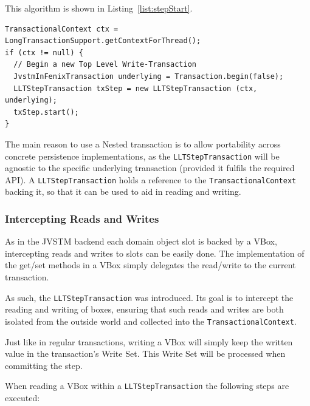 \documentclass{llncs}
\begin{document}
This algorithm is shown in Listing~\ref{list:stepStart}.

\begin{lstlisting}[caption={Beginning a new Long Lived Transaction
    step}, label={list:stepStart}, float]
TransactionalContext ctx = LongTransactionSupport.getContextForThread();
if (ctx != null) {
  // Begin a new Top Level Write-Transaction
  JvstmInFenixTransaction underlying = Transaction.begin(false);
  LLTStepTransaction txStep = new LLTStepTransaction (ctx, underlying);
  txStep.start();
}
\end{lstlisting}

The main reason to use a Nested transaction is to allow portability
across concrete persistence implementations, as the
\texttt{LLTStepTransaction} will be agnostic to the specific
underlying transaction (provided it fulfils the required API). A
\texttt{LLTStepTransaction} holds a reference to the
\texttt{TransactionalContext} backing it, so that it can be used to
aid in reading and writing.

\subsubsection{Intercepting Reads and Writes}

As in the JVSTM backend each domain object slot is backed by a VBox,
intercepting reads and writes to slots can be easily done. The
implementation of the get/set methods in a VBox simply delegates the
read/write to the current transaction.

As such, the \texttt{LLTStepTransaction} was introduced. Its goal is
to intercept the reading and writing of boxes, ensuring that such
reads and writes are both isolated from the outside world and
collected into the \texttt{TransactionalContext}.

Just like in regular transactions, writing a VBox will simply keep the
written value in the transaction's Write Set. This Write Set will be
processed when committing the step.

When reading a VBox within a \texttt{LLTStepTransaction} the following
steps are executed:
\end{document}
